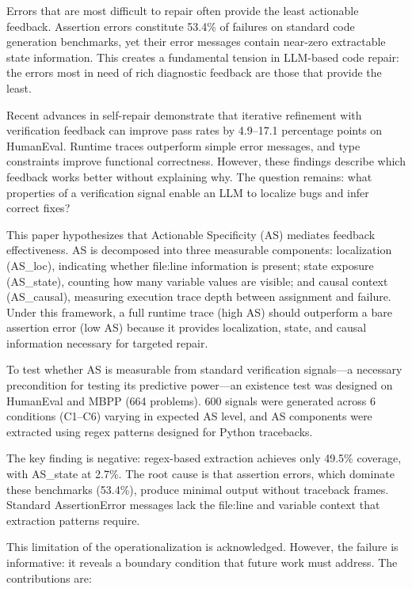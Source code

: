 
Errors that are most difficult to repair often provide the least actionable feedback. Assertion errors constitute 53.4\% of failures on standard code generation benchmarks, yet their error messages contain near-zero extractable state information. This creates a fundamental tension in LLM-based code repair: the errors most in need of rich diagnostic feedback are those that provide the least.

Recent advances in self-repair demonstrate that iterative refinement with verification feedback can improve pass rates by 4.9--17.1 percentage points on HumanEval. Runtime traces outperform simple error messages, and type constraints improve functional correctness. However, these findings describe which feedback works better without explaining why. The question remains: what properties of a verification signal enable an LLM to localize bugs and infer correct fixes?

This paper hypothesizes that Actionable Specificity (AS) mediates feedback effectiveness. AS is decomposed into three measurable components: localization (AS\_loc), indicating whether file:line information is present; state exposure (AS\_state), counting how many variable values are visible; and causal context (AS\_causal), measuring execution trace depth between assignment and failure. Under this framework, a full runtime trace (high AS) should outperform a bare assertion error (low AS) because it provides localization, state, and causal information necessary for targeted repair.

To test whether AS is measurable from standard verification signals---a necessary precondition for testing its predictive power---an existence test was designed on HumanEval and MBPP (664 problems). 600 signals were generated across 6 conditions (C1--C6) varying in expected AS level, and AS components were extracted using regex patterns designed for Python tracebacks.

The key finding is negative: regex-based extraction achieves only 49.5\% coverage, with AS\_state at 2.7\%. The root cause is that assertion errors, which dominate these benchmarks (53.4\%), produce minimal output without traceback frames. Standard AssertionError messages lack the file:line and variable context that extraction patterns require.

This limitation of the operationalization is acknowledged. However, the failure is informative: it reveals a boundary condition that future work must address. The contributions are:

